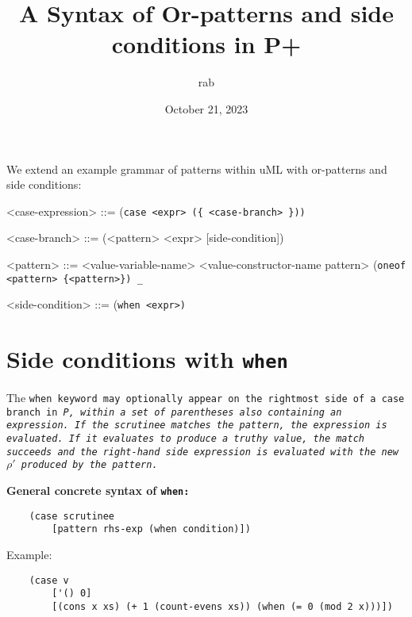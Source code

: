 \documentclass[]{article}
\title{A Syntax of Or-patterns and side conditions in P+}
\author{rab}
\date{October 21, 2023}
\begin{document}
\maketitle


We extend an example grammar of patterns within uML with 
or-patterns and side conditions: 

\bigskip

\begin{grammar}
    <case-expression> ::= (\tt{case} <expr> (\{ <case-branch> \}))
    
    <case-branch> ::= (<pattern> <expr> [side-condition])
    
    <pattern> ::= <value-variable-name>
    \alt <value-constructor-name {pattern}>
    \alt (\tt{oneof} <pattern> \{<pattern>\})
    \alt \texttt{_}
    
    <side-condition> ::= (\tt{when} <expr>)
\end{grammar}

\bigskip

\section{Side conditions with \tt{when}}

The \tt{when} keyword may optionally appear on the rightmost side of a \tt{case}
branch in \it{P}, within a set of parentheses also containing an expression.
If the scrutinee matches the pattern, the expression is evaluated. If it 
evaluates to produce a truthy value, the match succeeds and the right-hand
side expression is evaluated with the new $\rho'$ produced by the pattern.

\medskip

\bf{General concrete syntax of \tt{when}: }

\begin{verbatim}
    (case scrutinee
        [pattern rhs-exp (when condition)])
\end{verbatim}


Example: 
\begin{verbatim}
    (case v
        ['() 0]
        [(cons x xs) (+ 1 (count-evens xs)) (when (= 0 (mod 2 x)))])
\end{verbatim}



\medskip
\end{document}
